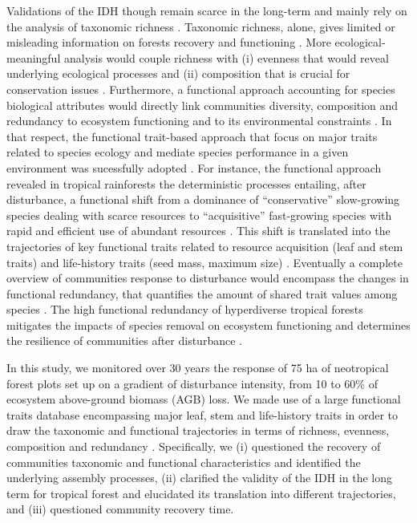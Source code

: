 \documentclass[fleqn,10pt]{ArtEcoFoG} %
\begin{document}
Validations of the IDH though remain scarce in the long-term and mainly
rely on the analysis of taxonomic richness \citep{Molino2001}. Taxonomic
richness, alone, gives limited or misleading information on forests
recovery and functioning \citep{Martin2015, Chaudhary2016}. More
ecological-meaningful analysis would couple richness with (i) evenness
that would reveal underlying ecological processes and (ii) composition
that is crucial for conservation issues
\citep{Magurran1988, Lavorel2002, Bellwood2006}. Furthermore, a
functional approach accounting for species biological attributes would
directly link communities diversity, composition and redundancy to
ecosystem functioning and to its environmental constraints
\citep{Violle2007b, Moretti2009, Baraloto2012a, Scheiter2013}. In that
respect, the functional trait-based approach that focus on major traits
related to species ecology and mediate species performance in a given
environment was sucessfully adopted \citep{Diaz2005, Villeger2008a}. For
instance, the functional approach revealed in tropical rainforests the
deterministic processes entailing, after disturbance, a functional shift
from a dominance of ``conservative'' slow-growing species dealing with
scarce resources to ``acquisitive'' fast-growing species with rapid and
efficient use of abundant resources
\citep{TerSteege2001, Reich2014, Herault2011}. This shift is translated
into the trajectories of key functional traits related to resource
acquisition (leaf and stem traits) and life-history traits (seed mass,
maximum size)
\citep{Wright2004, TerSteege2006, Westoby2006a, Chave2009b}. Eventually
a complete overview of communities response to disturbance would
encompass the changes in functional redundancy, that quantifies the
amount of shared trait values among species \citep{Carmona2016}. The
high functional redundancy of hyperdiverse tropical forests
\citep{Bellwood2006} mitigates the impacts of species removal on
ecosystem functioning and determines the resilience of communities after
disturbance \citep{Trenbath1999, Elmqvist2003, Diaz2005}.

In this study, we monitored over 30 years the response of 75 ha of
neotropical forest plots set up on a gradient of disturbance intensity,
from 10 to 60\% of ecosystem above-ground biomass (AGB) loss. We made
use of a large functional traits database encompassing major leaf, stem
and life-history traits in order to draw the taxonomic and functional
trajectories in terms of richness, evenness, composition and redundancy
\citep{Lohbeck2015, Guariguata2001}. Specifically, we (i) questioned the
recovery of communities taxonomic and functional characteristics and
identified the underlying assembly processes, (ii) clarified the
validity of the IDH in the long term for tropical forest and elucidated
its translation into different trajectories, and (iii) questioned
community recovery time.
\end{document}
